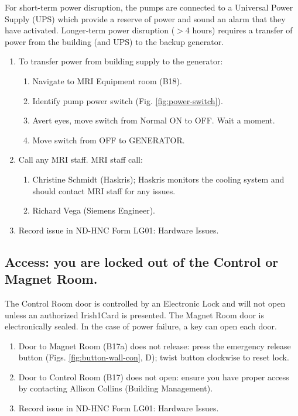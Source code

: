 \documentclass[11pt]{article}
\begin{document}
For short-term power disruption, the pumps are connected to a Universal Power Supply (UPS) which provide a reserve of power and sound an alarm that they have activated. Longer-term power disruption ($>$4 hours) requires a transfer of power from the building (and UPS) to the backup generator.

\begin{enumerate}

	\item To transfer power from building supply to the generator:
	\begin{enumerate}
		\item Navigate to MRI Equipment room (B18).
		\item Identify pump power switch (Fig. \ref{fig:power-switch}).
		\item Avert eyes, move switch from Normal ON to OFF. Wait a moment.
		\item Move switch from OFF to GENERATOR.
	\end{enumerate}
	\item Call any MRI staff. MRI staff call:
	\begin{enumerate}
		\item Christine Schmidt (Haskris); Haskris monitors the cooling system and should contact MRI staff for any issues.
		\item Richard Vega (Siemens Engineer).
	\end{enumerate}
	\item Record issue in ND-HNC Form LG01: Hardware Issues.
\end{enumerate}


\subsection{Access: you are locked out of the Control or Magnet Room.}
\label{ssec:access}

The Control Room door is controlled by an Electronic Lock and will not open unless an authorized Irish1Card is presented. The Magnet Room door is electronically sealed. In the case of power failure, a key can open each door.

\begin{enumerate}
	\item Door to Magnet Room (B17a) does not release: press the emergency release button (Figs. \ref{fig:button-wall-con}, D); twist button clockwise to reset lock.
	\item Door to Control Room (B17) does not open: ensure you have proper access by contacting Allison Collins (Building Management).
	\item Record issue in ND-HNC Form LG01: Hardware Issues.
\end{enumerate}
\end{document}
